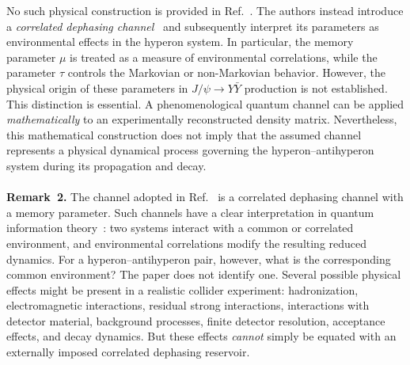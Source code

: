 \documentclass[epjc,twocolumn,nofootinbib,preprintnumbers,amsmath,amssymb]{revtex4-2}
\begin{document}
No such physical construction is provided in Ref.~\cite{Bachain}.
The authors instead introduce a \textit{correlated dephasing channel}~\cite{Ref4,HuZhou2019,Daffer2004} and subsequently interpret its parameters as environmental effects in the hyperon system. In particular, the memory parameter $\mu$ is treated as a measure of environmental correlations, while the parameter $\tau$ controls the Markovian or non-Markovian behavior. However, the physical origin of these parameters in $J/\psi\rightarrow Y\bar Y$ production is not established.
This distinction is essential. A phenomenological quantum channel can be applied \textit{mathematically} to an experimentally reconstructed density matrix. Nevertheless, this mathematical construction does not imply that the assumed channel represents a physical dynamical process governing the hyperon--antihyperon system during its propagation and decay.
\\
\\
\textbf{Remark~2.}
The channel adopted in Ref.~\cite{Bachain} is a correlated dephasing channel with a memory parameter. Such channels have a clear interpretation in quantum information theory~\cite{Ref4}: two systems interact with a common or correlated environment, and environmental correlations modify the resulting reduced dynamics.
For a hyperon--antihyperon pair, however, what is the corresponding common environment?
The paper does not identify one. Several possible physical effects might be present in a realistic collider experiment: hadronization, electromagnetic interactions, residual strong interactions, interactions with detector material, background processes, finite detector resolution, acceptance effects, and decay dynamics. But these effects \textit{cannot} simply be equated with an externally imposed correlated dephasing reservoir.
\end{document}
